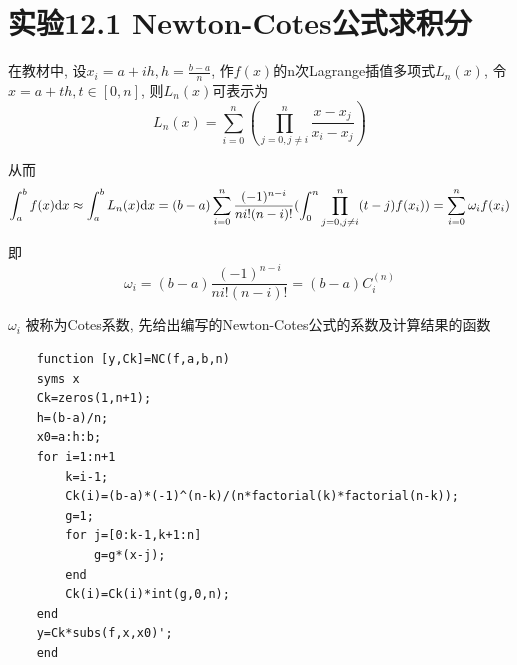 \documentclass[10pt]{SelfArx} %
\numberwithin{dummy}{section}
\begin{document}
\section{实验12.1 Newton-Cotes公式求积分}
在教材\cite{1}中, 设$x_i=a+ih, h=\displaystyle\frac{b-a}{n}$, 作$f(x)$的n次Lagrange插值多项式$L_n(x)$, 令$x=a+th, t\in[0,n]$, 则$L_n(x)$可表示为
\begin{displaymath}
	L_n(x)=\sum_{i=0}^{n}(\prod_{j=0,j\neq i}^{n}\displaystyle\frac{x-x_j}{x_i-x_j})
\end{displaymath}

从而
\begin{displaymath}
	\int_{a}^{b}f(x){\rm d}x\approx\int_{a}^{b}L_n(x){\rm d}x=(b-a)\sum_{i=0}^{n}\displaystyle\frac{(-1)^{n-i}}{ni!(n-i)!}(\int_{0}^{n}\prod_{j=0,j\neq i}^n(t-j)f(x_i))=\sum_{i=0}^n\omega_if(x_i)
\end{displaymath}

即
\begin{displaymath}
	\omega_i=(b-a)\displaystyle\frac{(-1)^{n-i}}{ni!(n-i)!}=(b-a)C_i^{(n)}
\end{displaymath}

$\omega_i$ 被称为Cotes系数, 先给出编写的Newton-Cotes公式的系数及计算结果的函数
\begin{lstlisting}
	function [y,Ck]=NC(f,a,b,n)
	syms x
	Ck=zeros(1,n+1);
	h=(b-a)/n;
	x0=a:h:b;
	for i=1:n+1
		k=i-1;
		Ck(i)=(b-a)*(-1)^(n-k)/(n*factorial(k)*factorial(n-k));
		g=1;
		for j=[0:k-1,k+1:n]
			g=g*(x-j);
		end
		Ck(i)=Ck(i)*int(g,0,n);
	end
	y=Ck*subs(f,x,x0)';
	end
\end{lstlisting}
\end{document}
